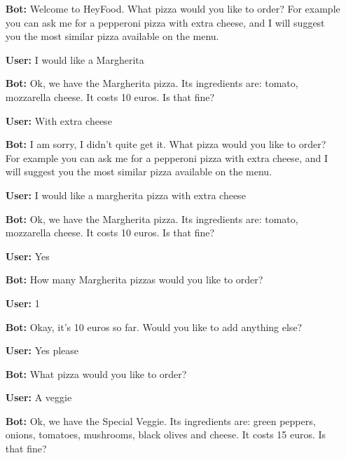 \begin{itemize}

\item[\textbf{Bot:}] Welcome to HeyFood.
What pizza would you like to order? For example you can ask me for a pepperoni pizza with extra cheese, and I will suggest you the most similar pizza available on the menu.

\item[\textbf{User:}] I would like a Margherita

\item[\textbf{Bot:}] Ok, we have the Margherita pizza. Its ingredients are: tomato, mozzarella cheese. It costs 10 euros. Is that fine?

\item[\textbf{User:}] With extra cheese

\item[\textbf{Bot:}] I am sorry, I didn’t quite get it. What pizza would you like to order? For example you can ask me for a pepperoni pizza with extra cheese, and I will suggest you the most similar pizza available on the menu.

\item[\textbf{User:}] I would like a margherita pizza with extra cheese

\item[\textbf{Bot:}] Ok, we have the Margherita pizza. Its ingredients are: tomato, mozzarella cheese. It costs 10 euros. Is that fine?

\item[\textbf{User:}] Yes

\item[\textbf{Bot:}] How many Margherita pizzas would you like to order?

\item[\textbf{User:}] 1

\item[\textbf{Bot:}] Okay, it’s 10 euros so far. Would you like to add anything else?

\item[\textbf{User:}] Yes please

\item[\textbf{Bot:}] What pizza would you like to order?

\item[\textbf{User:}] A veggie

\item[\textbf{Bot:}] Ok, we have the Special Veggie. Its ingredients are: green peppers, onions, tomatoes, mushrooms, black olives and cheese. It costs 15 euros. Is that fine?


\end{itemize}
